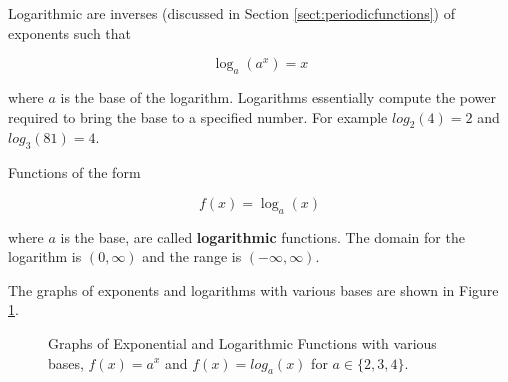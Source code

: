         Logarithmic are inverses (discussed in Section \ref{sect:periodicfunctions}) of exponents such that

        \begin{equation}
            \log_a(a^x) = x
        \end{equation}

        \noindent where $a$ is the base of the logarithm. Logarithms essentially compute the power required to bring the base to a specified number. For example $log_2(4) = 2$ and $log_3(81) = 4$.

        \begin{definition}
            Functions of the form

            \begin{equation}
                f(x) = \log_a(x)
            \end{equation}

            where $a$ is the base, are called \textbf{logarithmic} functions. The domain for the logarithm is $(0,\infty)$ and the range is $(-\infty,\infty)$.
        \end{definition}

        The graphs of exponents and logarithms with various bases are shown in Figure \ref{fig:exploggraphs}.

        \medskip

        \begin{figure}
            \centering
            \caption{Graphs of Exponential and Logarithmic Functions with various bases, $f(x) = a^x$ and $f(x) = log_a(x)$ for $a \in \{2,3,4\}$.}
            \label{fig:exploggraphs}
        \end{figure}

